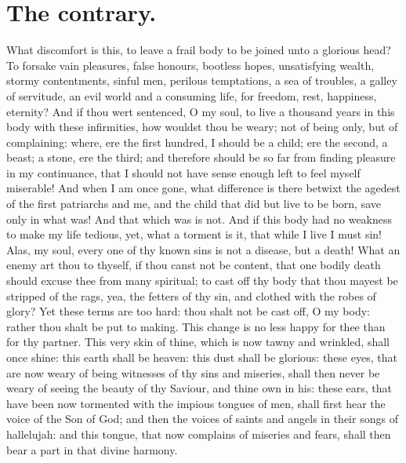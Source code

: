 \section{The contrary.}
What discomfort is this, to leave a frail body to be joined unto a glorious head? To forsake vain pleasures, false honours, bootless hopes, unsatisfying wealth, stormy contentments, sinful men, perilous temptations, a sea of troubles, a galley of servitude, an evil world and a consuming life, for freedom, rest, happiness, eternity? And if thou wert sentenced, O my soul, to live a thousand years in this body with these infirmities, how wouldst thou be weary; not of being only, but of complaining: where, ere the first hundred, I should be a child; ere the second, a beast; a stone, ere the third; and therefore should be so far from finding pleasure in my continuance, that I should not have sense enough left to feel myself miserable! And when I am once gone, what difference is there betwixt the agedest of the first patriarchs and me, and the child that did but live to be born, save only in what was! And that which was is not. And if this body had no weakness to make my life tedious, yet, what a torment is it, that while I live I must sin! Alas, my soul, every one of thy known sins is not a disease, but a death! What an enemy art thou to thyself, if thou canst not be content, that one bodily death should excuse thee from many spiritual; to cast off thy body that thou mayest be stripped of the rags, yea, the fetters of thy sin, and clothed with the robes of glory? Yet these terms are too hard: thou shalt not be cast off, O my body: rather thou shalt be put to making. This change is no less happy for thee than for thy partner. This very skin of thine, which is now tawny and wrinkled, shall once shine: this earth shall be heaven: this dust shall be glorious: these eyes, that are now weary of being witnesses of thy sins and miseries, shall then never be weary of seeing the beauty of thy Saviour, and thine own in his: these ears, that have been now tormented with the impious tongues of men, shall first hear the voice of the Son of God; and then the voices of saints and angels in their songs of hallelujah: and this tongue, that now complains of miseries and fears, shall then bear a part in that divine harmony.


